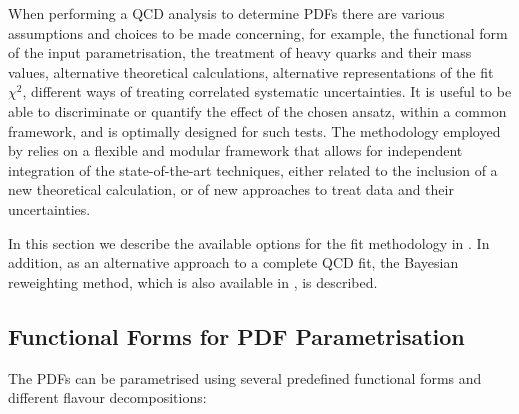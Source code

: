 


When performing a QCD analysis to determine PDFs there are various assumptions and choices to be made concerning, for example, the functional form of the input parametrisation, the treatment of heavy quarks and their mass values, alternative theoretical calculations, alternative representations of the fit $\chi^2$, different ways of treating correlated systematic uncertainties.
%
 It is useful to be able to discriminate or quantify the effect of the chosen ansatz, within a common framework, and 
\fitter is optimally designed for such tests.
%
The methodology employed by \fitter  relies on a flexible and modular
framework that allows for independent integration of the state-of-the-art techniques, either related to the inclusion of a new theoretical calculation, or of new approaches to treat data and their uncertainties. 

In this section we describe the available options for the fit methodology in \fitter.
%
In addition, as an alternative approach to a complete QCD fit, the Bayesian reweighting
method, which is also available in \fitter, is described.
\subsection{Functional Forms for PDF Parametrisation}
The PDFs can be parametrised using several predefined
functional forms and different flavour decompositions:
